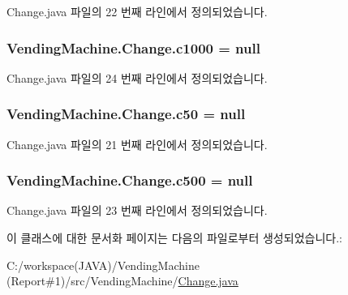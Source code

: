 Change.\+java 파일의 22 번째 라인에서 정의되었습니다.

\subsubsection[{\texorpdfstring{c1000}{c1000}}]{ Vending\+Machine.\+Change.\+c1000 = null\hspace{0.3cm}{\ttfamily [private]}}\hypertarget{class_vending_machine_1_1_change_ae3e92935c527ac2d76998fa6a7560804}{}\label{class_vending_machine_1_1_change_ae3e92935c527ac2d76998fa6a7560804}


Change.\+java 파일의 24 번째 라인에서 정의되었습니다.

\subsubsection[{\texorpdfstring{c50}{c50}}]{ Vending\+Machine.\+Change.\+c50 = null\hspace{0.3cm}{\ttfamily [private]}}\hypertarget{class_vending_machine_1_1_change_ae6535f613cfce78eb2e8c8b246c81aea}{}\label{class_vending_machine_1_1_change_ae6535f613cfce78eb2e8c8b246c81aea}


Change.\+java 파일의 21 번째 라인에서 정의되었습니다.

\subsubsection[{\texorpdfstring{c500}{c500}}]{ Vending\+Machine.\+Change.\+c500 = null\hspace{0.3cm}{\ttfamily [private]}}\hypertarget{class_vending_machine_1_1_change_a249122ed59018ac11a88b1644ba214d3}{}\label{class_vending_machine_1_1_change_a249122ed59018ac11a88b1644ba214d3}


Change.\+java 파일의 23 번째 라인에서 정의되었습니다.



이 클래스에 대한 문서화 페이지는 다음의 파일로부터 생성되었습니다.\+:\begin{DoxyCompactItemize}
\item 
C\+:/workspace(\+J\+A\+V\+A)/\+Vending\+Machine (\+Report\#1)/src/\+Vending\+Machine/\hyperlink{_change_8java}{Change.\+java}\end{DoxyCompactItemize}
